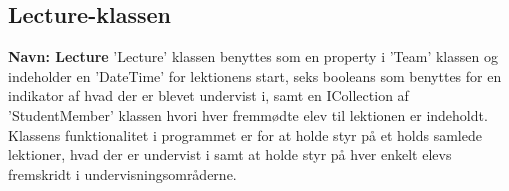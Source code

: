 \subsection{Lecture-klassen}
\textbf{Navn: Lecture}
'Lecture' klassen benyttes som en property i 'Team' klassen og indeholder en 'DateTime' for lektionens start, seks booleans som benyttes for en indikator af hvad der er blevet undervist i, samt en ICollection af 'StudentMember' klassen hvori hver fremmødte elev til lektionen er indeholdt.
Klassens funktionalitet i programmet er for at holde styr på et holds samlede lektioner, hvad der er undervist i samt at holde styr på hver enkelt elevs fremskridt i undervisningsområderne.